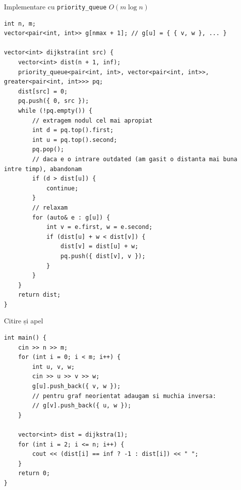 \documentclass[10pt]{beamer}
\begin{document}
\begin{frame}{Implementare cu \texttt{priority\_queue} \textemdash{} $O(m \log n)$}
\begin{lstlisting}
int n, m;
vector<pair<int, int>> g[nmax + 1]; // g[u] = { { v, w }, ... }

vector<int> dijkstra(int src) {
    vector<int> dist(n + 1, inf);
    priority_queue<pair<int, int>, vector<pair<int, int>>, greater<pair<int, int>>> pq;
    dist[src] = 0;
    pq.push({ 0, src });
    while (!pq.empty()) {
        // extragem nodul cel mai apropiat
        int d = pq.top().first;
        int u = pq.top().second;
        pq.pop();
        // daca e o intrare outdated (am gasit o distanta mai buna intre timp), abandonam
        if (d > dist[u]) {
            continue;
        }
        // relaxam
        for (auto& e : g[u]) {
            int v = e.first, w = e.second;
            if (dist[u] + w < dist[v]) {
                dist[v] = dist[u] + w;
                pq.push({ dist[v], v });
            }
        }
    }
    return dist;
}
\end{lstlisting}
\end{frame}

\begin{frame}[fragile]{Citire și apel}
\begin{lstlisting}
int main() {
    cin >> n >> m;
    for (int i = 0; i < m; i++) {
        int u, v, w;
        cin >> u >> v >> w;
        g[u].push_back({ v, w });
        // pentru graf neorientat adaugam si muchia inversa:
        // g[v].push_back({ u, w });
    }

    vector<int> dist = dijkstra(1);
    for (int i = 2; i <= n; i++) {
        cout << (dist[i] == inf ? -1 : dist[i]) << " ";
    }
    return 0;
}
\end{lstlisting}
\end{frame}
\end{document}

